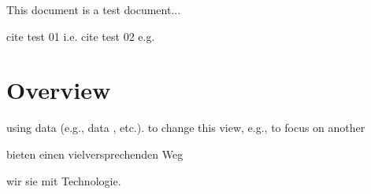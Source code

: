\documentclass{article}
\begin{document}
This document is a test document...

cite test 01 i.e.
cite test 02 e.g.


\section{Overview}


using data (e.g., data , etc.).
to change this view, e.g., to focus on another

bieten 
einen 
vielversprechenden 
Weg

wir sie mit
Technologie. 
\end{document}
